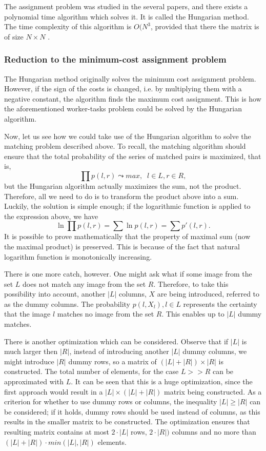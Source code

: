 \documentclass[times, utf8, zavrsni]{fer}
\begin{document}
The assignment problem was studied in the several papers, and there exists a
polynomial time algorithm which solves it. It is called the Hungarian method.
The time complexity of this algorithm is $O(N^3$, provided that there the
matrix is of size $N \times N$ \citep{hungarian-algorithm}.

\subsubsection{Reduction to the minimum-cost assignment problem}
The Hungarian method originally solves the minimum cost assignment
problem. However, if the sign of the costs is changed, i.e. by multiplying
them with a negative constant, the algorithm finds the maximum cost assignment.
This is how the aforementioned worker-tasks problem could be solved by the
Hungarian algorithm.

Now, let us see how we could take use of the Hungarian algorithm to solve the
matching problem described above. To recall, the matching algorithm should
ensure that the total probability of the series of matched pairs is maximized,
that is, \[ \prod{p(l, r)} \leadsto max, \;\;l \in L, r \in R ,\] but the
Hungarian algorithm actually maximizes the sum, not the product. Therefore, all
we need to do is to transform the product above into a sum. Luckily, the
solution is simple enough; if the logarithmic function is applied to the
expression above, we have \[ \ln \prod{p(l, r)} = \sum \ln p(l, r) = \sum p'(l,
r) .\] It is possible to prove mathematically that the property of maximal sum
(now the maximal product) is preserved. This is because of the fact that natural
logarithm function is monotonically increasing.

There is one more catch, however. One might ask what if some image from the set
$L$ does not match any image from the set $R$. Therefore, to take this
possibility into account, another $|L|$ columns, $X$ are being introduced,
referred to as the dummy columns. The probability $p(l, X_l), l \in L$
represents the certainty that the image $l$ matches no image from the set $R$.
This enables up to $|L|$ dummy matches.

There is another optimization which can be considered. Observe that if $|L|$ is
much larger then $|R|$, instead of introducing another $|L|$ dummy columns, we
might introduce $|R|$ dummy rows, so a matrix of $(|L| + |R|) \times |R|$ is
constructed. The total number of elements, for the case $L >> R$ can be
approximated with $L$. It can be seen that this is a huge optimization, since
the first approach would result in a $|L| \times (|L| + |R|)$ matrix being
constructed. As a criterion for whether to use dummy rows or columns, the
inequality $|L| \geq |R|$ can be considered; if it holds, dummy rows should be
used instead of columns, as this results in the smaller matrix to be
constructed. The optimization ensures that resulting matrix contains at most $2
\cdot |L|$ rows, $2 \cdot |R|)$ columns and no more than $(|L| + |R|) \cdot
min(|L|, |R|)$ elements.
\end{document}
